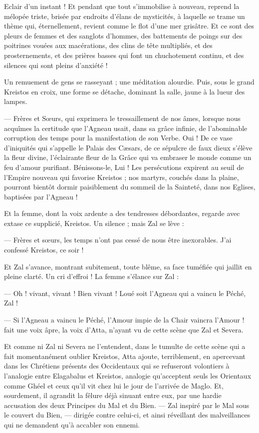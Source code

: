 \documentclass[a4paper, 11pt, oneside, polutonikogreek, french]{article}
\begin{document}
Eclair d'un instant ! Et pendant que tout s'immobilise à nouveau, reprend la mélopée triste, brisée par endroits d'élans de mysticités, à laquelle se trame un thème qui, éternellement, revient comme le flot d'une mer grisâtre. Et ce sont des pleurs de femmes et des sanglots d'hommes, des battements de poings sur des poitrines vouées aux macérations, des clins de tête multipliés, et des prosternements, et des prières basses qui font un chuchotement continu, et des silences qui sont pleins d'anxiété !

Un remuement de gens se rasseyant ; une méditation alourdie. Puis, sous le grand Kreistos en croix, une forme se détache, dominant la salle, jaune à la lueur des lampes.

--- Frères et Sœurs, qui exprimera le tressaillement de nos âmes, lorsque nous acquîmes la certitude que l'Agneau usait, dans sa grâce infinie, de l'abominable corruption des temps pour la manifestation de son Verbe. Oui ! De ce vase d'iniquités qui s'appelle le Palais des Cæsars, de ce sépulcre de faux dieux s'élève la fleur divine, l'éclairante fleur de la Grâce qui va embraser le monde comme un feu d'amour purifiant. Bénissons-le, Lui ! Les persécutions expirent au seuil de l'Empire nouveau qui favorise Kreistos ; nos martyrs, couchés dans la plaine, pourront bientôt dormir paisiblement du sommeil de la Sainteté, dans nos Eglises, baptisées par l'Agneau !

Et la femme, dont la voix ardente a des tendresses débordantes, regarde avec extase ce supplicié, Kreistos. Un silence ; mais Zal se lève :

--- Frères et sœurs, les temps n'ont pas cessé de nous être inexorables. J'ai confessé Kreistos, ce soir !

Et Zal s'avance, montrant subitement, toute blême, sa face tuméfiée qui jaillit en pleine clarté. Un cri d'effroi ! La femme s'élance sur Zal :

--- Oh ! vivant, vivant ! Bien vivant ! Loué soit l'Agneau qui a vaincu le Péché, Zal !

--- Si l'Agneau a vaincu le Péché, l'Amour impie de la Chair vaincra l'Amour ! fait une voix âpre, la voix d'Atta, n'ayant vu de cette scène que Zal et Severa.

Et comme ni Zal ni Severa ne l'entendent, dans le tumulte de cette scène qui a fait momentanément oublier Kreistos, Atta ajoute, terriblement, en apercevant dans les Chrétiens présents des Occidentaux qui se refuseront volontiers à l'analogie entre Elagabalus et Kreistos, analogie qu'acceptent seuls les Orientaux comme Ghéel et ceux qu'il vit chez lui le jour de l'arrivée de Maglo. Et, sourdement, il agrandit la fêlure déjà sinuant entre eux, par une hardie accusation des deux Principes du Mal et du Bien. --- Zal inspiré par le Mal sous le couvert du Bien, --- dirigée contre celui-ci, et ainsi réveillant des malveillances qui ne demandent qu'à accabler son ennemi.
\end{document}
